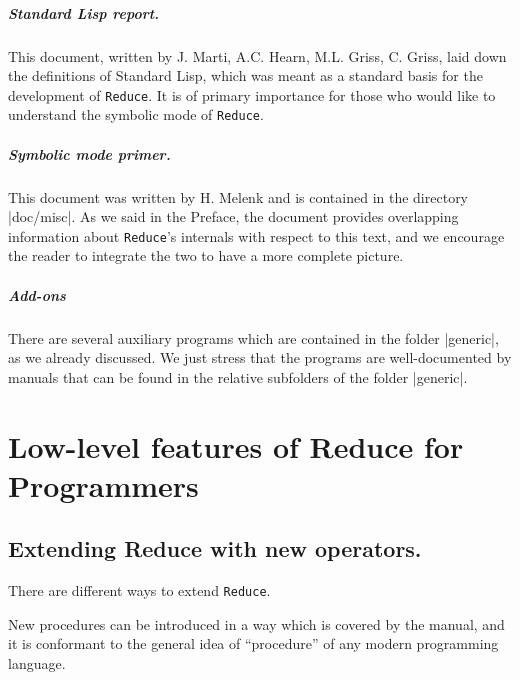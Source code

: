 \documentclass[12pt,twoside,openright]{memoir}
\newcommand{\reduce}{\texttt{Reduce}\xspace}
\begin{document}
\paragraph{Standard Lisp report.} This document, written by J. Marti,
A.C. Hearn, M.L. Griss, C. Griss, laid down the definitions of Standard Lisp,
which was meant as a standard basis for the development of \reduce. It is of
primary importance for those who would like to understand the symbolic mode of
\reduce.

\paragraph{Symbolic mode primer.} This document was written by H. Melenk
\cite{melenk} and is contained in the directory |doc/misc|. As we said in the
Preface, the document provides overlapping information about \reduce's
internals with respect to this text, and we encourage the reader to integrate
the two to have a more complete picture.


\paragraph{Add-ons} There are several auxiliary programs which are contained in
the folder |generic|, as we already discussed. We just stress that the programs
are well-documented by manuals that can be found in the relative subfolders of
the folder |generic|.

\chapter{Low-level features of Reduce
  for Programmers}

\section{Extending Reduce with new operators.}
\label{sec:extend-reduce-with}

There are different ways to extend \reduce.

New procedures can be introduced in a way which is covered by the manual, and
it is conformant to the general idea of ``procedure'' of any modern programming
language.
\end{document}
